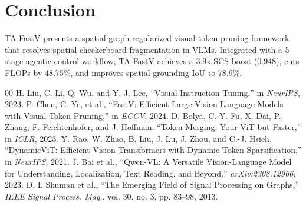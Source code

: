\documentclass[conference]{IEEEtran}
\begin{document}
\section{Conclusion}
TA-FastV presents a spatial graph-regularized visual token pruning framework that resolves spatial checkerboard fragmentation in VLMs. Integrated with a 5-stage agentic control workflow, TA-FastV achieves a 3.9x SCS boost ($0.948$), cuts FLOPs by 48.75\%, and improves spatial grounding IoU to 78.9\%.

\begin{thebibliography}{00}
 H. Liu, C. Li, Q. Wu, and Y. J. Lee, ``Visual Instruction Tuning,'' in \textit{NeurIPS}, 2023.
 P. Chen, C. Ye, et al., ``FastV: Efficient Large Vision-Language Models with Visual Token Pruning,'' in \textit{ECCV}, 2024.
 D. Bolya, C.-Y. Fu, X. Dai, P. Zhang, F. Feichtenhofer, and J. Hoffman, ``Token Merging: Your ViT but Faster,'' in \textit{ICLR}, 2023.
 Y. Rao, W. Zhao, B. Liu, J. Lu, J. Zhou, and C.-J. Hsieh, ``DynamicViT: Efficient Vision Transformers with Dynamic Token Sparsification,'' in \textit{NeurIPS}, 2021.
 J. Bai et al., ``Qwen-VL: A Versatile Vision-Language Model for Understanding, Localization, Text Reading, and Beyond,'' \textit{arXiv:2308.12966}, 2023.
 D. I. Shuman et al., ``The Emerging Field of Signal Processing on Graphs,'' \textit{IEEE Signal Process. Mag.}, vol. 30, no. 3, pp. 83--98, 2013.
\end{thebibliography}
\end{document}
